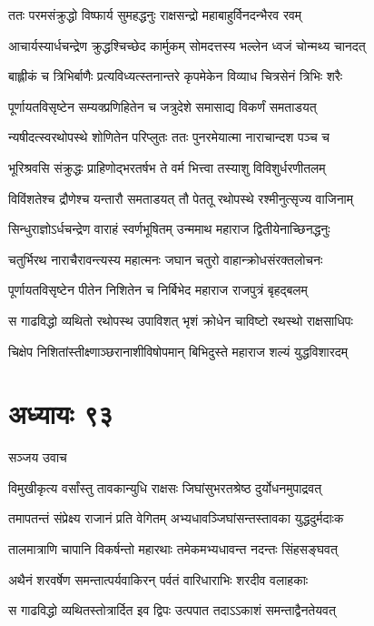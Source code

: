 \twolineshloka
{ततः परमसंक्रुद्धो विष्फार्य सुमहद्धनुः}
{राक्षसन्द्रो महाबाहुर्विनदन्भैरव रवम्}


\twolineshloka
{आचार्यस्यार्धचन्द्रेण क्रुद्धश्चिच्छेद कार्मुकम्}
{सोमदत्तस्य भल्लेन ध्वजं चोन्मथ्य चानदत्}


\twolineshloka
{बाह्लीकं च त्रिभिर्बाणैः प्रत्यविध्यत्स्तनान्तरे}
{कृपमेकेन विव्याध चित्रसेनं त्रिभिः शरैः}


\twolineshloka
{पूर्णायतविसृष्टेन सम्यक्प्रणिहितेन च}
{जत्रुदेशे समासाद्य विकर्णं समताडयत्}


\twolineshloka
{न्यषीदत्स्वरथोपस्थे शोणितेन परिप्लुतः}
{ततः पुनरमेयात्मा नाराचान्दश पञ्च च}


\twolineshloka
{भूरिश्रवसि संक्रुद्धः प्राहिणोद्भरतर्षभ}
{ते वर्म भित्त्वा तस्याशु विविशुर्धरणीतलम्}


\twolineshloka
{विविंशतेश्च द्रौणेश्च यन्तारौ समताडयत्}
{तौ पेततू रथोपस्थे रश्मीनुत्सृज्य वाजिनाम्}


\twolineshloka
{सिन्धुराज्ञोऽर्धचन्द्रेण वाराहं स्वर्णभूषितम्}
{उन्ममाथ महाराज द्वितीयेनाच्छिनद्धनुः}


\twolineshloka
{चतुर्भिरथ नाराचैरावन्त्यस्य महात्मनः}
{जघान चतुरो वाहान्क्रोधसंरक्तलोचनः}


\twolineshloka
{पूर्णायतविसृष्टेन पीतेन निशितेन च}
{निर्बिभेद महाराज राजपुत्रं बृहद्बलम्}


\twolineshloka
{स गाढविद्धो व्यथितो रथोपस्थ उपाविशत्}
{भृशं क्रोधेन चाविष्टो रथस्थो राक्षसाधिपः}


\twolineshloka
{चिक्षेप निशितांस्तीक्ष्णाञ्छरानाशीविषोपमान्}
{बिभिदुस्ते महाराज शल्यं युद्धविशारदम्}


\chapter{अध्यायः ९३}
\twolineshloka
{सञ्जय उवाच}
{}


\twolineshloka
{विमुखीकृत्य वर्सांस्तु तावकान्युधि राक्षसः}
{जिघांसुभरतश्रेष्ठ दुर्योधनमुपाद्रवत्}


\twolineshloka
{तमापतन्तं संप्रेक्ष्य राजानं प्रति वेगितम्}
{अभ्यधावञ्जिघांसन्तस्तावका युद्धदुर्मदाःक}


\twolineshloka
{तालमात्राणि चापानि विकर्षन्तो महारथाः}
{तमेकमभ्यधावन्त नदन्तः सिंहसङ्घवत्}


\twolineshloka
{अथैनं शरवर्षेण समन्तात्पर्यवाकिरन्}
{पर्वतं वारिधाराभिः शरदीव वलाहकाः}


\twolineshloka
{स गाढविद्धो व्यथितस्तोत्रार्दित इव द्विपः}
{उत्पपात तदाऽऽकाशं समन्ताद्वैनतेयवत्}



